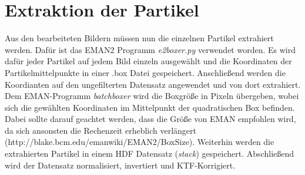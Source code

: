 \section{Extraktion der Partikel} %
\label{sec:extraktion_der_partikel}

Aus den bearbeiteten Bildern müssen nun die einzelnen Partikel extrahiert werden.
Dafür ist das EMAN2 Programm \textit{e2boxer.py} verwendet worden.
Es wird dafür jeder Partikel auf jedem Bild einzeln ausgewählt und die Koordinaten der Partikelmittelpunkte in einer .box Datei gespeichert.
Anschließend werden die Koordianten auf den ungefilterten Datensatz angewendet und von dort extrahiert.
Dem EMAN-Programm \textit{batchboxer} wird die Boxgröße in Pixeln übergeben, wobei sich die gewählten Koordinaten im Mittelpunkt der quadratischen Box befinden.
Dabei sollte darauf geachtet werden, dass die Größe von EMAN empfohlen wird, da sich ansonsten die Rechenzeit erheblich verlängert (http://blake.bcm.edu/emanwiki/EMAN2/BoxSize).
Weiterhin werden die extrahierten Partikel in einem HDF Datensatz (\textit{stack}) gespeichert.
Abschließend wird der Datensatz normalisiert, invertiert und KTF-Korrigiert.

\FloatBarrier